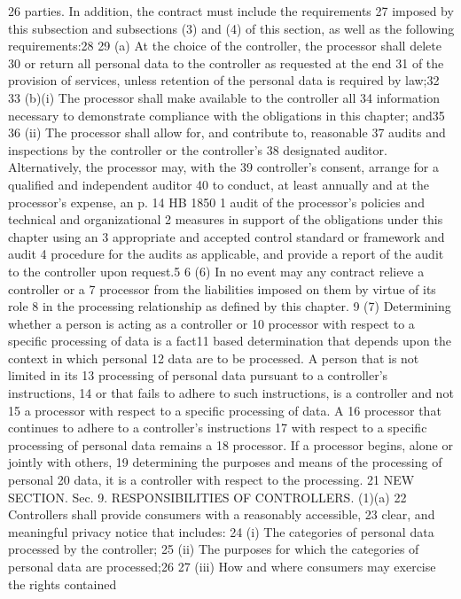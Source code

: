 26 parties. In addition, the contract must include the requirements
27 imposed by this subsection and subsections (3) and (4) of this
section, as well as the following requirements:28
29 (a) At the choice of the controller, the processor shall delete
30 or return all personal data to the controller as requested at the end
31 of the provision of services, unless retention of the personal data
is required by law;32
33 (b)(i) The processor shall make available to the controller all
34 information necessary to demonstrate compliance with the obligations
in this chapter; and35
36 (ii) The processor shall allow for, and contribute to, reasonable
37 audits and inspections by the controller or the controller's
38 designated auditor. Alternatively, the processor may, with the
39 controller's consent, arrange for a qualified and independent auditor
40 to conduct, at least annually and at the processor's expense, an
p. 14 HB 1850
1 audit of the processor's policies and technical and organizational
2 measures in support of the obligations under this chapter using an
3 appropriate and accepted control standard or framework and audit
4 procedure for the audits as applicable, and provide a report of the
audit to the controller upon request.5
6 (6) In no event may any contract relieve a controller or a
7 processor from the liabilities imposed on them by virtue of its role
8 in the processing relationship as defined by this chapter.
9 (7) Determining whether a person is acting as a controller or
10 processor with respect to a specific processing of data is a fact11 based determination that depends upon the context in which personal
12 data are to be processed. A person that is not limited in its
13 processing of personal data pursuant to a controller's instructions,
14 or that fails to adhere to such instructions, is a controller and not
15 a processor with respect to a specific processing of data. A
16 processor that continues to adhere to a controller's instructions
17 with respect to a specific processing of personal data remains a
18 processor. If a processor begins, alone or jointly with others,
19 determining the purposes and means of the processing of personal
20 data, it is a controller with respect to the processing.
21 NEW SECTION. Sec. 9. RESPONSIBILITIES OF CONTROLLERS. (1)(a)
22 Controllers shall provide consumers with a reasonably accessible,
23 clear, and meaningful privacy notice that includes:
24 (i) The categories of personal data processed by the controller;
25 (ii) The purposes for which the categories of personal data are
processed;26
27 (iii) How and where consumers may exercise the rights contained
